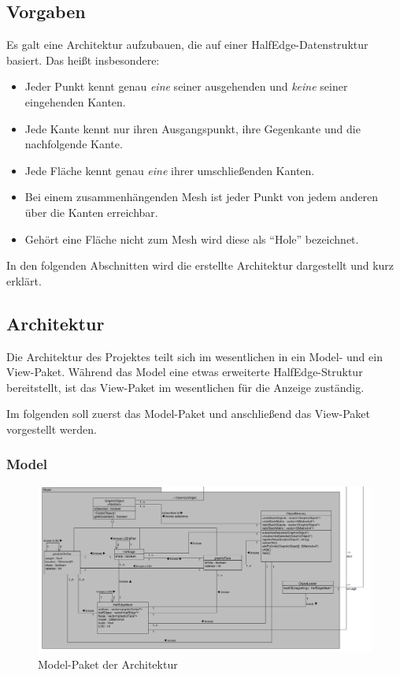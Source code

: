 \subsection{Vorgaben}
Es galt eine Architektur aufzubauen, die auf einer HalfEdge-Datenstruktur basiert. Das heißt insbesondere:
\begin{itemize}
\item Jeder Punkt kennt genau \textit{eine} seiner ausgehenden und \textit{keine} seiner eingehenden Kanten.
\item Jede Kante kennt nur ihren Ausgangspunkt, ihre Gegenkante und die nachfolgende Kante.
\item Jede Fläche kennt genau \textit{eine} ihrer umschließenden Kanten. 
\item Bei einem zusammenhängenden Mesh ist jeder Punkt von jedem anderen über die Kanten erreichbar.
\item Gehört eine Fläche nicht zum Mesh wird diese als ``Hole'' bezeichnet.
\end{itemize}
In den folgenden Abschnitten wird die erstellte Architektur dargestellt und kurz erklärt.

\subsection{Architektur}
Die Architektur des Projektes teilt sich im wesentlichen in ein Model- und ein View-Paket. 
Während das Model eine etwas erweiterte HalfEdge-Struktur bereitstellt, ist das View-Paket im wesentlichen für die Anzeige zuständig. 

Im folgenden soll zuerst das Model-Paket und anschließend das View-Paket vorgestellt werden.

\subsubsection{Model}
\begin{figure}[htbp]
\includegraphics[angle=90,scale=0.5]{content/pictures/architekturModel.png}
\caption{Model-Paket der Architektur}
\label{fig:model}
\end{figure}


